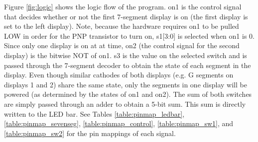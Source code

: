 \documentclass[11pt]{article}
\begin{document}
Figure \ref{fig:logic} shows the logic flow of the program. on1 is the control signal that decides whether or not the first 7-segment display is on (the first display is set to the left display). Note, because the hardware requires on1 to be pulled LOW in order for the PNP transistor to turn on, s1[3:0] is selected when on1 is 0. Since only one display is on at at time, on2 (the control signal for the second display) is the bitwise NOT of on1. s3 is the value on the selected switch and is passed through the 7-segment decoder to obtain the state of each segment in the display. Even though similar cathodes  of both displays (e.g. G segments on displays 1 and 2) share the same state, only the segments in one display will be powered (as determined by the states of on1 and on2). The sum of both switches are simply passed through an adder to obtain a 5-bit sum. This sum is directly written to the LED bar. See Tables \ref{table:pinmap_ledbar}, \ref{table:pinmap_sevenseg}, \ref{table:pinmap_control}, \ref{table:pinmap_sw1}, and \ref{table:pinmap_sw2} for the pin mappings of each signal. \\
\end{document}
